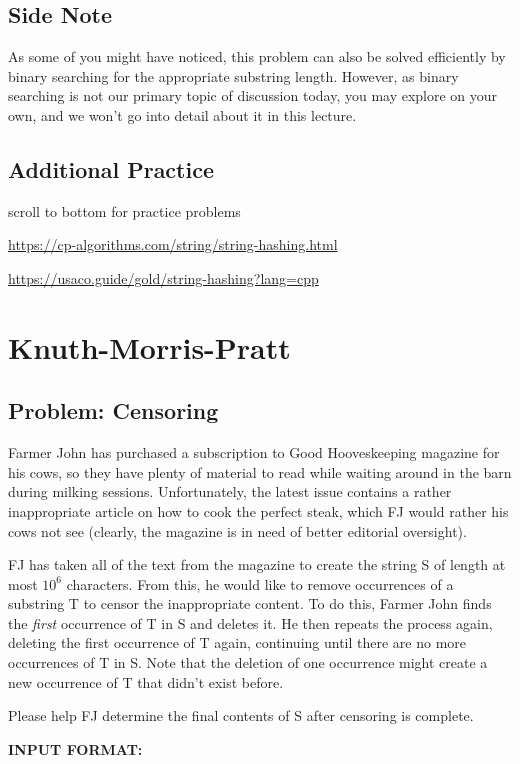 \documentclass{article}
\begin{document}
\subsection{Side Note}
As some of you might have noticed, this problem can also be solved efficiently by binary searching for the appropriate substring length. However, as binary searching is not our primary topic of discussion today, you may explore on your own, and we won't go into detail about it in this lecture.

\subsection{Additional Practice}
scroll to bottom for practice problems

\url{https://cp-algorithms.com/string/string-hashing.html} 

\url{https://usaco.guide/gold/string-hashing?lang=cpp}


\section{Knuth-Morris-Pratt}

\subsection{Problem: Censoring}
Farmer John has purchased a subscription to Good Hooveskeeping 
magazine for his cows, so they have plenty of material to read 
while waiting around in the barn during milking sessions. 
Unfortunately, the latest issue contains a rather inappropriate 
article on how to cook the perfect steak, which FJ would rather his 
cows not see (clearly, the magazine is in need of better editorial 
oversight).

FJ has taken all of the text from the magazine to create the string 
S of length at most \(10^6\) characters. From this, he would like to 
remove occurrences of a substring T to censor the inappropriate 
content. To do this, Farmer John finds the {\it first} occurrence of T 
in S and deletes it. He then repeats the process again, deleting 
the first occurrence of T again, continuing until there are no more 
occurrences of T in S. Note that the deletion of one occurrence 
might create a new occurrence of T that didn't exist before.

Please help FJ determine the final contents of S after censoring is 
complete.

{\bf INPUT FORMAT:}
\end{document}
